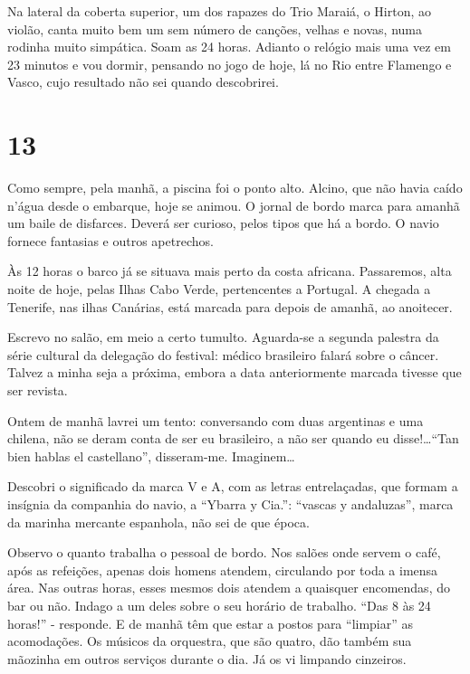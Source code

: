 Na lateral da coberta superior, um dos rapazes do Trio Maraiá, o Hirton, ao violão, canta muito bem um sem número de canções, velhas e novas, numa rodinha muito simpática. Soam as 24 horas. Adianto o relógio mais uma vez em 23 minutos e vou dormir, pensando no jogo de hoje, lá no Rio entre Flamengo e Vasco, cujo resultado não sei quando descobrirei.

\section*{13 \adfflatleafright {}}

Como sempre, pela manhã, a piscina foi o ponto alto. Alcino, que não havia caído n’água desde o embarque, hoje se animou. O jornal de bordo marca para amanhã um baile de disfarces. Deverá ser curioso, pelos tipos que há a bordo. O navio fornece fantasias e outros apetrechos.

Às 12 horas o barco já se situava mais perto da costa africana. Passaremos, alta noite de hoje, pelas Ilhas Cabo Verde, pertencentes a Portugal. A chegada a Tenerife, nas ilhas Canárias, está marcada para depois de amanhã, ao anoitecer.

Escrevo no salão, em meio a certo tumulto. Aguarda-se a segunda palestra da série cultural da delegação do festival: médico brasileiro falará sobre o câncer. Talvez a minha seja a próxima, embora a data anteriormente marcada tivesse que ser revista.

Ontem de manhã lavrei um tento: conversando com duas argentinas e uma chilena, não se deram conta de ser eu brasileiro, a não ser quando eu disse!\ldots “Tan bien hablas el castellano”, disseram-me. Imaginem\ldots

Descobri o significado da marca V e A, com as letras entrelaçadas, que formam a insígnia da companhia do navio, a “Ybarra y Cia.”: “vascas y andaluzas”, marca da marinha mercante espanhola, não sei de que época.

Observo o quanto trabalha o pessoal de bordo. Nos salões onde servem o café, após as refeições, apenas dois homens atendem, circulando por toda a imensa área. Nas outras horas, esses mesmos dois atendem a quaisquer encomendas, do bar ou não. Indago a um deles sobre o seu horário de trabalho. “Das 8 às 24 horas!” - responde. E de manhã têm que estar a postos para “limpiar” as acomodações. Os músicos da orquestra, que são quatro, dão também sua mãozinha em outros serviços durante o dia. Já os vi limpando cinzeiros.

